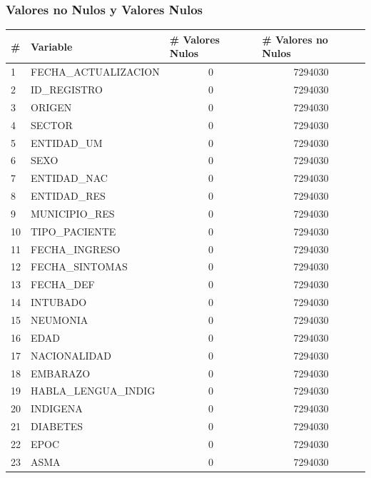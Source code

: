 \subsubsection{Valores no Nulos y Valores Nulos}
\begin{table}[h]
\resizebox{10cm}{!} {
\begin{tabular}{|l|l|c|c|}
\hline
\# & Variable & \multicolumn{1}{l|}{\# Valores Nulos} & \multicolumn{1}{l|}{\# Valores no Nulos} \\ \hline
1  & FECHA\_ACTUALIZACION    & 0 & 7294030 \\ \hline
2  & ID\_REGISTRO            & 0 & 7294030 \\ \hline
3  & ORIGEN                  & 0 & 7294030 \\ \hline
4  & SECTOR                  & 0 & 7294030 \\ \hline
5  & ENTIDAD\_UM             & 0 & 7294030 \\ \hline
6  & SEXO                    & 0 & 7294030 \\ \hline
7  & ENTIDAD\_NAC            & 0 & 7294030 \\ \hline
8  & ENTIDAD\_RES            & 0 & 7294030 \\ \hline
9  & MUNICIPIO\_RES          & 0 & 7294030 \\ \hline
10 & TIPO\_PACIENTE          & 0 & 7294030 \\ \hline
11 & FECHA\_INGRESO          & 0 & 7294030 \\ \hline
12 & FECHA\_SINTOMAS         & 0 & 7294030 \\ \hline
13 & FECHA\_DEF              & 0 & 7294030 \\ \hline
14 & INTUBADO                & 0 & 7294030 \\ \hline
15 & NEUMONIA                & 0 & 7294030 \\ \hline
16 & EDAD                    & 0 & 7294030 \\ \hline
17 & NACIONALIDAD            & 0 & 7294030 \\ \hline
18 & EMBARAZO                & 0 & 7294030 \\ \hline
19 & HABLA\_LENGUA\_INDIG    & 0 & 7294030 \\ \hline
20 & INDIGENA                & 0 & 7294030 \\ \hline
21 & DIABETES                & 0 & 7294030 \\ \hline
22 & EPOC                    & 0 & 7294030 \\ \hline
23 & ASMA                    & 0 & 7294030 \\ \hline

\end{tabular}}
\end{table}
